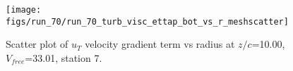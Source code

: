 \begin{figure}[H]
\centering
\texttt{[image: figs/run\_70/run\_70\_turb\_visc\_ettap\_bot\_vs\_r\_meshscatter]}
\caption{Scatter plot of $
u_T$ velocity gradient term vs radius at $z/c$=10.00, $V_{free}$=33.01, station 7.}
\end{figure}


